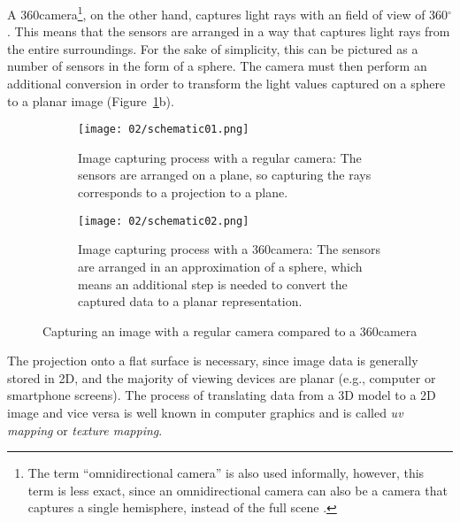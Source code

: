 A 360\degree camera\footnote{The term ``omnidirectional camera'' is also used informally, however, this term is less exact, since an omnidirectional camera can also be a camera that captures a single hemisphere, instead of the full scene \cite{omnidir}.}, on the other hand, captures light rays with an field of view of 360$^{\circ}$. This means that the sensors are arranged in a way that captures light rays from the entire surroundings. For the sake of simplicity, this can be pictured as a number of sensors in the form of a sphere\footnotemark. The camera must then perform an additional conversion in order to transform the light values captured on a sphere to a planar image (Figure~\ref{fig:cameras}b). \cite{omnidir}


\begin{figure}[p]
\centering
    \begin{subfigure}[t]{0.9\textwidth}            
            \centering
            \texttt{[image: 02/schematic01.png]}
            \caption{Image capturing process with a regular camera: The sensors are arranged on a plane, so capturing the rays corresponds to a projection to a plane.}
    \end{subfigure}
    \begin{subfigure}[t]{0.9\textwidth}
            \centering
            \texttt{[image: 02/schematic02.png]}
            \caption{Image capturing process with a 360\degree camera: The sensors are arranged in an approximation of a sphere, which means an additional step is needed to convert the captured data to a planar representation.}
    \end{subfigure}
    \caption{Capturing an image with a regular camera compared to a 360\degree camera}\label{fig:cameras}
\end{figure}

The projection onto a flat surface is necessary, since image data is generally stored in 2D, and the majority of viewing devices are planar (e.g., computer or smartphone screens). The process of translating data from a 3D model to a 2D image and vice versa is well known in computer graphics and is called \emph{uv mapping} or \emph{texture mapping}.

